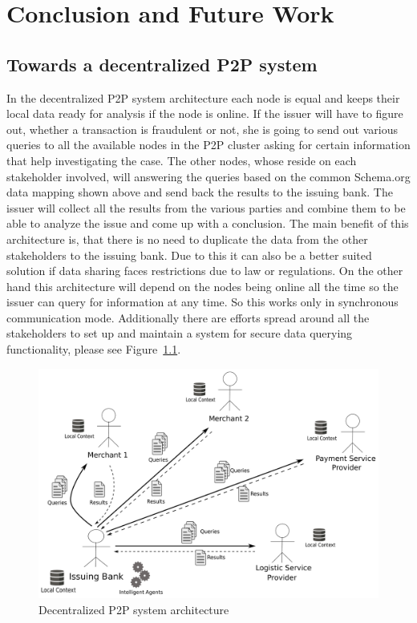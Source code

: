 
\chapter{Conclusion and Future Work} %
\label{cha:conclusion}


\section{Towards a decentralized \gls{P2P} system}
\label{sec:p2p_decentralized_system}

In the decentralized P2P system architecture each node is equal and keeps their local data ready for analysis if the node is online. If the issuer will have to figure out, whether a transaction is fraudulent or not, she is going to send out various queries to all the available nodes in the P2P cluster asking for certain information that help investigating the case. The other nodes, whose reside on each stakeholder involved, will answering the queries based on the common Schema.org data mapping shown above and send back the results to the issuing bank. The issuer will collect all the results from the various parties and combine them to be able to analyze the issue and come up with a conclusion. The main benefit of this architecture is, that there is no need to duplicate the data from the other stakeholders to the issuing bank. Due to this it can also be a better suited solution if data sharing faces restrictions due to law or regulations. On the other hand this architecture will depend on the nodes being online all the time so the issuer can query for information at any time. So this works only in synchronous communication mode. Additionally there are efforts spread around all the stakeholders to set up and maintain a system for secure data querying functionality, please see Figure~\ref{fig:images_p2p_decentralized}.

\begin{figure}[H]
	\centering
		\includegraphics[width=0.8\columnwidth]{images/system_P2P_decentralized.pdf}
	\caption{Decentralized \gls{P2P} system architecture}
\label{fig:images_p2p_decentralized}
\end{figure}


